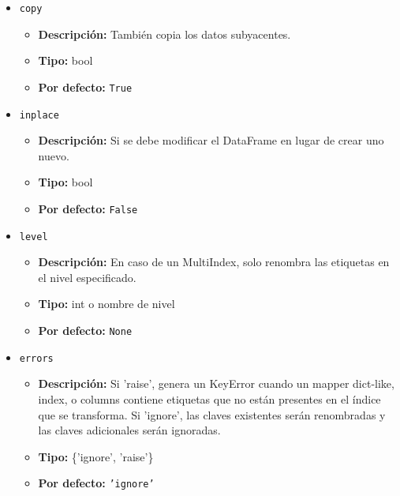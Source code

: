 \begin{itemize}
            \item \texttt{copy}
                \begin{itemize}
                    \item \textbf{Descripción:} También copia los datos subyacentes.
                    \item \textbf{Tipo:} bool
                    \item \textbf{Por defecto:} \texttt{True}
                \end{itemize}

            \item \texttt{inplace}
                \begin{itemize}
                    \item \textbf{Descripción:} Si se debe modificar el DataFrame en lugar de crear uno nuevo.
                    \item \textbf{Tipo:} bool
                    \item \textbf{Por defecto:} \texttt{False}
                \end{itemize}

            \item \texttt{level}
                \begin{itemize}
                    \item \textbf{Descripción:} En caso de un MultiIndex, solo renombra las etiquetas en el nivel especificado.
                    \item \textbf{Tipo:} int o nombre de nivel
                    \item \textbf{Por defecto:} \texttt{None}
                \end{itemize}

            \item \texttt{errors}
                \begin{itemize}
                    \item \textbf{Descripción:} Si 'raise', genera un KeyError cuando un mapper dict-like, index, o columns contiene etiquetas que no están presentes en el índice que se transforma. Si 'ignore', las claves existentes serán renombradas y las claves adicionales serán ignoradas.
                    \item \textbf{Tipo:} \{'ignore', 'raise'\}
                    \item \textbf{Por defecto:} \texttt{'ignore'}
                \end{itemize}
        \end{itemize}

